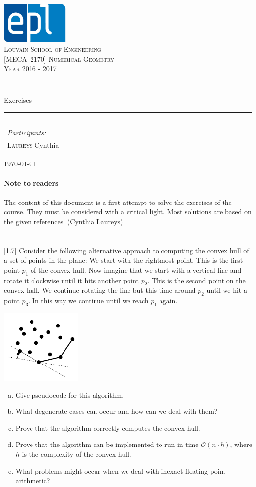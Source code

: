 \documentclass[11pt]{article}
\newenvironment{Quest}{ \begin{framed}} {\end{framed}  \vspace{0.2 cm}}
\renewcommand{\maketitle}{\begin{titlepage}
\begin{center}

\includegraphics[width=0.25\textwidth]{epl-logo}~\\[1cm]

\textsc{\LARGE Louvain School of Engineering }\\[0.8cm]
\textsc{\Large [MECA~2170] Numerical Geometry}\\[0.8cm]

\textsc{\Large Year 2016 - 2017}\\


\begin{center}
    \vskip 20pt
    \hrule height 1pt
    \vskip 1pt 
    \hrule
    \vskip 15pt
    {\Huge \bfseries \strut Exercises \strut}\par
    \vskip 15pt
    \hrule
    \vskip 1pt
    \hrule height 1pt
    \vskip 20pt
\end{center}

{\Large
\begin{tabu} to 0.8\linewidth {Xll}
    \emph{Participants:}\\
    \quad \textsc{Laureys} Cynthia\\ [0.1cm]
\end{tabu}
}
\vfill

{\large \today}
\end{center}
\end{titlepage}
  \setcounter{footnote}{0}%
}
\begin{document}
\maketitle

\setlength{\parskip}{.4cm}
\everymath{\displaystyle}
\parindent0mm

\thispagestyle{empty}
\tableofcontents
\newpage

\thispagestyle{empty}
\paragraph{Note to readers} The content of this document is a first attempt to solve the exercises of the course. They must be considered with a critical light. Most solutions are based on the given references. (Cynthia Laureys)
\newpage


\section{}

\begin{Quest}

[1.7] Consider the following alternative approach to computing the convex hull of a set of points in the plane: We start with the rightmost point. This is the first point $p_1$ of the convex hull. Now imagine that we start with a vertical line and rotate it clockwise until it hits another point $p_2$. This is the second point on the convex hull. We continue rotating the line but this time around $p_2$ until we hit a point $p_3$. In this way we continue until we reach $p_1$ again.

\includegraphics[width=0.3\textwidth]{exercise1}

\begin{enumerate}[a.]
    \item Give pseudocode for this algorithm.
    \item What degenerate cases can occur and how can we deal with them?
    \item Prove that the algorithm correctly computes the convex hull.
    \item Prove that the algorithm can be implemented to run in time $\mathcal{O}(n \cdot h)$, where $h$ is the complexity of the convex hull.
    \item What problems might occur when we deal with inexact floating point arithmetic?
\end{enumerate}

\end{Quest}
\end{document}
